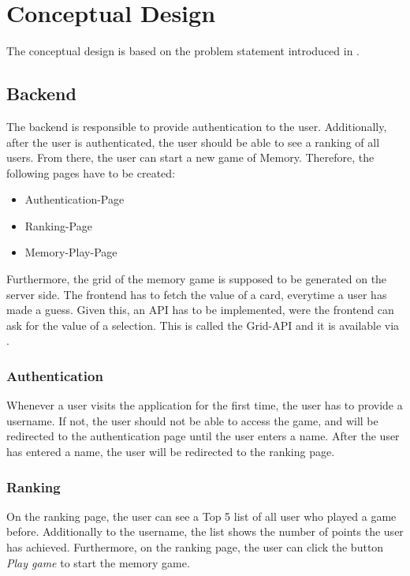 \section{Conceptual Design}\label{sec:02_design}
The conceptual design is based on the problem statement introduced in .


\subsection{Backend}\label{subsec:02_design_backend}
The backend is responsible to provide authentication to the user. Additionally, after the user is authenticated, the user should be able to see a ranking of all users. From there, the user can start a new game of Memory.
Therefore, the following pages have to be created:
\begin{itemize}
\item Authentication-Page 
\item Ranking-Page 
\item Memory-Play-Page 
\end{itemize}
Furthermore, the grid of the memory game is supposed to be generated on the server side. The frontend has to fetch the value of a card, everytime a user has made a guess. Given this, an API has to be implemented, were the frontend can ask for the value of a selection. This is called the Grid-API and it is available via .

\subsubsection{Authentication}\label{subsubsec:02_design_backend_auth}
Whenever a user visits the application for the first time, the user has to provide a username. If not, the user should not be able to access the game, and will be redirected to the authentication page until the user enters a name.
After the user has entered a name, the user will be redirected to the ranking page.

\subsubsection{Ranking}\label{subsubsec:02_design_backend_ranking}
On the ranking page, the user can see a Top 5 list of all user who played a game before. Additionally to the username, the list shows the number of points the user has achieved.
Furthermore, on the ranking page, the user can click the button \textit{Play game} to start the memory game.


